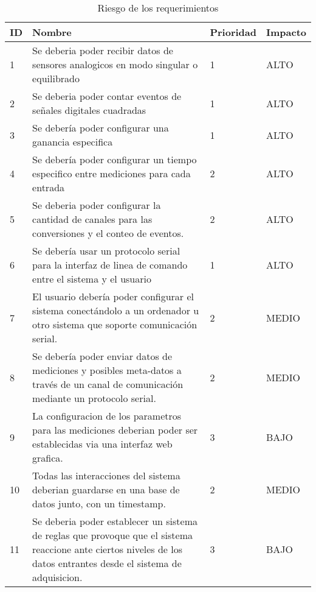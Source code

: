 \begin{table}[]
\centering
\caption{Riesgo de los requerimientos}
\label{tab:riesgoderequerimientos}
\begin{tabular}{|m{0.5cm}|m{9cm}|m{1.5cm}|m{1.5cm}|}
\hline
\cellcolor[HTML]{68CBD0}ID & \cellcolor[HTML]{68CBD0}Nombre & \cellcolor[HTML]{68CBD0}Prioridad & \cellcolor[HTML]{68CBD0}Impacto  \\
\hline
1 &  Se deberia poder recibir datos de sensores analogicos en modo singular o equilibrado & 1 & ALTO  \\
\hline
2 &  Se deberia poder contar eventos de señales digitales cuadradas & 1 & ALTO  \\
\hline
3 &  Se debería poder configurar una ganancia especifica & 1 & ALTO  \\
\hline
4 &  Se debería poder configurar un tiempo especifico entre mediciones para cada entrada & 2 & ALTO  \\
\hline
5 &  Se deberia poder configurar la cantidad de canales para las conversiones y el conteo de eventos. & 2 & ALTO  \\
\hline
6 &  Se debería usar un protocolo serial para la interfaz de linea de comando entre el sistema y el usuario & 1 & ALTO  \\
\hline
7 &  El usuario debería poder configurar el sistema conectándolo a un ordenador u otro sistema que soporte comunicación serial. & 2 & MEDIO  \\
\hline
8 &  Se debería poder enviar datos de mediciones y posibles meta-datos a través de un canal de comunicación mediante un protocolo serial. & 2 & MEDIO  \\
\hline
9 &  La configuracion de los parametros para las mediciones deberian poder ser establecidas via una interfaz web grafica. & 3 & BAJO  \\
\hline
10 &  Todas las interacciones del sistema deberian guardarse en una base de datos junto, con un timestamp. & 2 & MEDIO  \\
\hline
11 &  Se deberia poder establecer un sistema de reglas que provoque que el sistema reaccione ante ciertos niveles de los datos entrantes desde el sistema de adquisicion. & 3 & BAJO  \\
\hline
\end{tabular}
\end{table}


